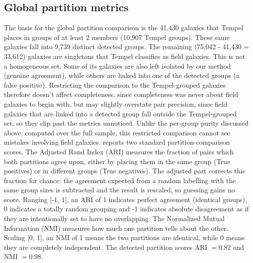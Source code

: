 \documentclass[9pt,a4paper,twocolumn,twoside]{rho-class/rho}
\begin{document}
\subsection{Global partition metrics}
The basis for the global partition comparison is the 41,430 galaxies that Tempel places in
groups of at least 2 members (10,907 Tempel groups). These same galaxies fall into 9,739
distinct detected groups.
The remaining (75,042 - 41,430 = 33,612) galaxies are singletons that Tempel classifies
as field galaxies. This is not a homogeneous set. Some of its galaxies are also left
isolated by our method (genuine agreement), while others are linked into one of the
detected groups (a false positive). Restricting the comparison
to the Tempel-grouped galaxies therefore doesn't affect completeness, since completeness was never
about field galaxies to begin with, but may slightly overstate
pair precision, since field galaxies that are linked into a detected group fall outside the
Tempel-grouped set, so they slip past the metrics unnoticed. Unlike the
per-group purity discussed above, computed over the full sample, this
restricted comparison cannot see mistakes involving field galaxies.
 reports two standard partition-comparison
scores. The Adjusted Rand Index (ARI) measures the fraction of pairs which
both partitions agree upon, either by placing them in the same group (True positives) or in different
groups (True negatives). The adjusted part corrects this fraction for chance:
the agreement expected from a random labelling with the same group sizes is
subtracted and the result is rescaled, so guessing gains no score.
Ranging [-1, 1], an ARI of 1 indicates perfect agreement (identical groups), 0
indicates a totally random grouping and -1 indicates absolute disagreement as
if they are intentionally set to have no overlapping. The Normalized Mutual
Information (NMI) measures how much one partition tells about the other. Scaling
[0, 1], an NMI of 1 means the two partitions are identical, while 0 means they are
completely independent. The detected partition scores ARI $= 0.82$ and NMI $= 0.98$.
\end{document}
